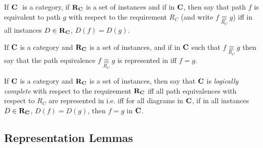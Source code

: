 \documentclass[10pt,a4paper]{article}
\theoremstyle{remark}
\renewcommand{\term}[1]{\textit{#1}}  %
\begin{document}
\newcommand{\pequiv}[1][R_C]{\underset{#1}{\equiv}}

\begin{definition}
If $\textbf{C}\ $ is a  category, if $\textbf{R}_{\textbf{C}}$ is a set of instances
 and if \fgparalleldiag in $\textbf{C}$, then say that path $f$ is equivalent to path $g$ with respect to the requirement $R_C$ 
 (and write $f \pequiv g$) iff
in all instances $D \in \textbf{R}_{\textbf{C}}$, $D(f)=D(g)$.
\end{definition}

\begin{definition}
If $\textbf{C}$ is a  category and $\textbf{R}_{\textbf{C}}$ is a set of instances,
 and if \fgparalleldiag in $\textbf{C}$ such that $f \pequiv g$
 then say that the path equivalence $f \pequiv g$ is represented in \catcw iff
 $f=g$.
\end{definition}

\begin{oldtt}
\begin{definition}
If $\textbf{C}$ is a  category and $\textbf{R}_{\textbf{C}}$ is a set of instances,
 then say that  $\textbf{C}$ is \term{logically complete} with respect 
to the requirement $\textbf{R}_{\textbf{C}}$ iff all path equivalences with respect to $R_C$ are represented in \catcw 
i.e. iff for all diagrams \fgparalleldiag in $\textbf{C}$,  
if in all instances $D \in \textbf{R}_{\textbf{C}}$, $D(f)=D(g)$,  then $f=g$ in $\textbf{C}$.
\end{definition}
\end{oldtt}

\subsection{Representation Lemmas}
\end{document}
